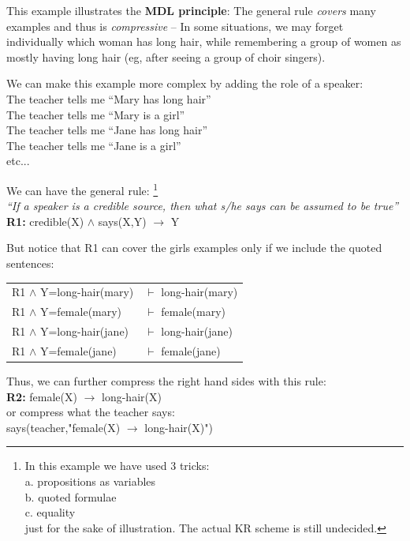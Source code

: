 This example illustrates the \textbf{MDL principle}:  The general rule \textit{covers} many examples and thus is \textit{compressive} -- In some situations, we may forget individually which woman has long hair, while remembering a group of women as mostly having long hair (eg, after seeing a group of choir singers).

We can make this example more complex by adding the role of a speaker:\\
\hspace*{1cm} The teacher tells me ``Mary has long hair''\\
\hspace*{1cm} The teacher tells me ``Mary is a girl''\\
\hspace*{1cm} The teacher tells me ``Jane has long hair''\\
\hspace*{1cm} The teacher tells me ``Jane is a girl''\\
\hspace*{1cm} etc...

We can have the general rule:
\footnote{In this example we have used 3 tricks:\\
a. propositions as variables\\
b. quoted formulae\\
c. equality\\
just for the sake of illustration.  The actual KR scheme is still undecided.}\\
\hspace*{1cm} \textit{``If a speaker is a credible source, then what s/he says can be assumed to be true''}\\
\hspace*{1cm} \textbf{R1:} \quad credible(X) $\wedge$ says(X,Y) $\rightarrow$ Y

But notice that R1 can cover the girls examples only if we include the quoted sentences:\\
\hspace*{1cm} \begin{tabular}{l l}
R1 $\wedge$ Y=long-hair(mary) & $\vdash$ long-hair(mary)\\
R1 $\wedge$ Y=female(mary)    & $\vdash$ female(mary)\\
R1 $\wedge$ Y=long-hair(jane) & $\vdash$ long-hair(jane)\\
R1 $\wedge$ Y=female(jane)    & $\vdash$ female(jane)
\end{tabular}

Thus, we can further compress the right hand sides with this rule:\\
\hspace*{1cm} \textbf{R2:} \quad female(X) $\rightarrow$ long-hair(X)\\
or compress what the teacher says:\\
\hspace*{1cm} says(teacher,"female(X) $\rightarrow$ long-hair(X)")

